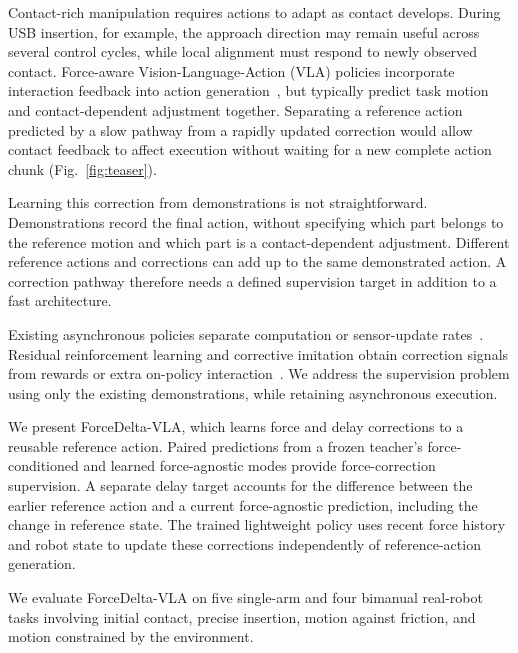 Contact-rich manipulation requires actions to adapt as contact develops. During USB insertion, for example, the approach direction may remain useful across several control cycles, while local alignment must respond to newly observed contact. Force-aware Vision-Language-Action (VLA) policies incorporate interaction feedback into action generation~\cite{yu2025forcevlaenhancingvlamodels,li2026forcevla2unleashinghybridforceposition,zhang2025tavlaelucidatingdesignspace}, but typically predict task motion and contact-dependent adjustment together. Separating a reference action predicted by a slow pathway from a rapidly updated correction would allow contact feedback to affect execution without waiting for a new complete action chunk (Fig.~\ref{fig:teaser}).

Learning this correction from demonstrations is not straightforward. Demonstrations record the final action, without specifying which part belongs to the reference motion and which part is a contact-dependent adjustment. Different reference actions and corrections can add up to the same demonstrated action. A correction pathway therefore needs a defined supervision target in addition to a fast architecture.

Existing asynchronous policies separate computation or sensor-update rates~\cite{li2026favlaforceadaptivefastslowvla,wang2026lateforceacceleratingvla,vanjani2026damvladecoupledasynchronousmultimodal}. Residual reinforcement learning and corrective imitation obtain correction signals from rewards or extra on-policy interaction~\cite{ankile2024imitationrefinementresidual,xu2025compliantresidualdaggerimproving}. We address the supervision problem using only the existing demonstrations, while retaining asynchronous execution.

We present ForceDelta-VLA, which learns force and delay corrections to a reusable reference action. Paired predictions from a frozen teacher's force-conditioned and learned force-agnostic modes provide force-correction supervision. A separate delay target accounts for the difference between the earlier reference action and a current force-agnostic prediction, including the change in reference state. The trained lightweight policy uses recent force history and robot state to update these corrections independently of reference-action generation.

We evaluate ForceDelta-VLA on five single-arm and four bimanual real-robot tasks involving initial contact, precise insertion, motion against friction, and motion constrained by the environment.


